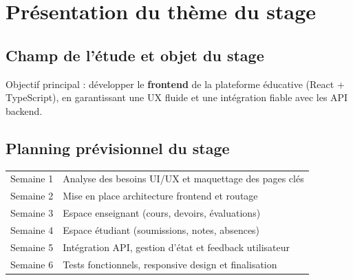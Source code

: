 \chapter{Présentation du thème du stage}

\section{Champ de l'étude et objet du stage}
Objectif principal : développer le \textbf{frontend} de la plateforme éducative (React + TypeScript), en garantissant une UX fluide et une intégration fiable avec les API backend.

\section{Planning prévisionnel du stage}
\begin{longtable}{p{}p{}}
\toprule
Semaine 1 & Analyse des besoins UI/UX et maquettage des pages clés \\
Semaine 2 & Mise en place architecture frontend et routage \\
Semaine 3 & Espace enseignant (cours, devoirs, évaluations) \\
Semaine 4 & Espace étudiant (soumissions, notes, absences) \\
Semaine 5 & Intégration API, gestion d'état et feedback utilisateur \\
Semaine 6 & Tests fonctionnels, responsive design et finalisation \\
\bottomrule
\end{longtable}
